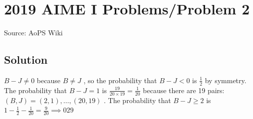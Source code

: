 \documentclass[12pt]{article}
\begin{document}
\section*{{2019 AIME I Problems/Problem 2}}
Source: AoPS Wiki

\subsection*{Solution}
$B-J \ne 0$ because $B \ne J$ , so the probability that $B-J < 0$ is $\frac{1}{2}$ by symmetry. The probability that $B-J = 1$ is $\frac{19}{20 \times 19} = \frac{1}{20}$ because there are 19 pairs: $(B,J) = (2,1), \ldots, (20,19)$ . The probability that $B-J \ge 2$ is $1-\frac{1}{2}-\frac{1}{20} = \frac{9}{20} \implies \boxed{029}$
\end{document}
